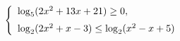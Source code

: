 \begin{ex}[type=ineq_system]
	\begin{condition}
		\( \left\{
		\begin{array}{l}
			\log_5(2x^2+13x+21)\ge0,\vspace{2mm}\\
			\log_2(2x^2+x-3)\le\log_2(x^2-x+5)
		\end{array}
		\right. \)
	\end{condition}
\end{ex}